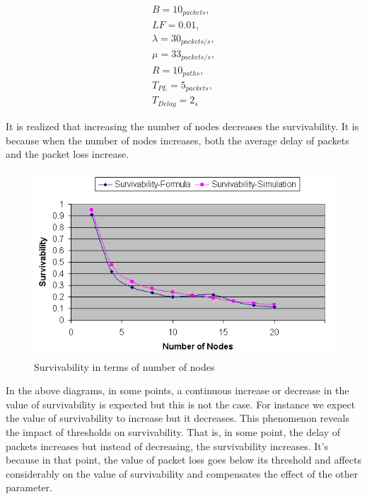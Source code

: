 \documentclass[onecolumn,conference]{IEEEtran}
\begin{document}
    \begin{equation}
        \begin{split}
            B=10_{packets},\\
            LF=0.01,\\
            \lambda=30_{packets/s},\\
            \mu=33_{packets/s},\\
            R=10_{paths},\\
            T_{PL}=5_{packets},\\
            T_{Delay}=2_s
        \end{split}
    \end{equation}

    It is realized that increasing the number of nodes decreases the survivability. It is because when the number of nodes increases, both the average delay of packets and the packet loss increase.

    \begin{figure}[htbp]
        \centerline{\includegraphics{rbpj5.png}}
        \caption{Survivability in terms of number of nodes}
        \label{fig:5}
    \end{figure}

    In the above diagrams, in some points, a continuous increase or decrease in the value of survivability is expected but this is not the case. For instance we expect the value of survivability to increase but it decreases. This phenomenon reveals the impact of thresholds on survivability. That is, in some point, the delay of packets increases but instead of decreasing, the survivability increases. It's because in that point, the value of packet loss goes below its threshold and affects considerably on the value of survivability and compensates the effect of the other parameter.
\end{document}
